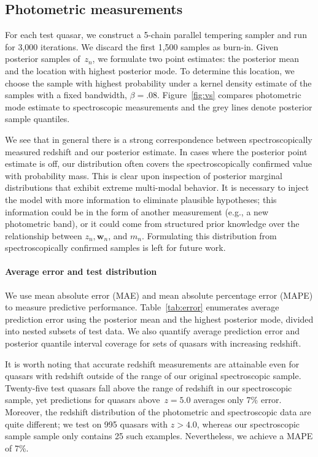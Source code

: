 \documentclass{article} %
\begin{document}
\subsection{Photometric measurements}
For each test quasar, we construct a 5-chain parallel tempering sampler and run for 3,000 iterations.
We discard the first 1,500 samples as burn-in.  
Given posterior samples of~$z_n$, we formulate two point estimates: the posterior mean and the location with highest posterior mode.
To determine this location, we choose the sample with highest probability under a kernel density estimate of the samples with a fixed bandwidth, ${\beta = .08}$.  
Figure~\ref{fig:vs} compares photometric mode estimate to spectroscopic measurements and the grey lines denote posterior sample quantiles. 

We see that in general there is a strong correspondence between spectroscopically measured redshift and our posterior estimate.
In cases where the posterior point estimate is off, our distribution often covers the spectroscopically confirmed value with probability mass.
This is clear upon inspection of posterior marginal distributions that exhibit extreme multi-modal behavior.  
It is necessary to inject the model with more information to eliminate plausible hypotheses; this information could be in the form of another measurement (e.g., a new photometric band), or it could come from structured prior knowledge over the relationship between $z_n, \mathbf{w}_n$, and $m_n$.
Formulating this distribution from spectroscopically confirmed samples is left for future work.  

\paragraph{Average error and test distribution}
We use mean absolute error (MAE) and mean absolute percentage error (MAPE) to measure predictive performance.  
Table~\ref{tab:error} enumerates average prediction error using the posterior mean and the highest posterior mode, divided into nested subsets of test data.  
We also quantify average prediction error and posterior quantile interval coverage for sets of quasars with increasing redshift.  

It is worth noting that accurate redshift measurements are attainable even for quasars with redshift outside of the range of our original spectroscopic sample.
Twenty-five test quasars fall above the range of redshift in our spectroscopic sample, yet predictions for quasars above~${z=5.0}$ averages only 7\% error.  
Moreover, the redshift distribution of the photometric and spectroscopic data are quite different; we test on 995 quasars with ${z > 4.0}$, whereas our spectroscopic sample sample only contains 25 such examples.
Nevertheless, we achieve a MAPE of 7\%.  
\end{document}
